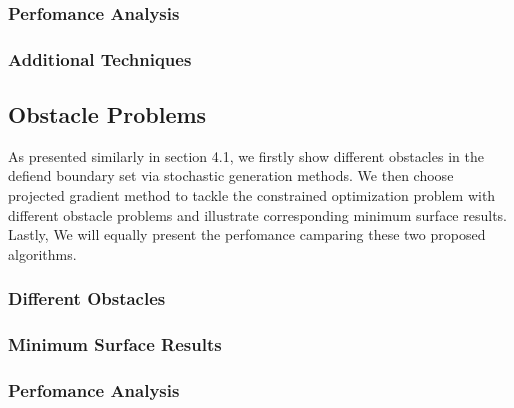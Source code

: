 \subsubsection{Perfomance Analysis}
\subsubsection{Additional Techniques}
\subsection{Obstacle Problems}
As presented similarly in section 4.1, we firstly show different obstacles in the defiend boundary set via stochastic generation methods. We then choose projected gradient method to tackle the constrained optimization problem with different obstacle problems and illustrate corresponding minimum surface results. Lastly, We will equally present the perfomance camparing these two proposed algorithms. 
\subsubsection{Different Obstacles}
\subsubsection{Minimum Surface Results}
\subsubsection{Perfomance Analysis}



